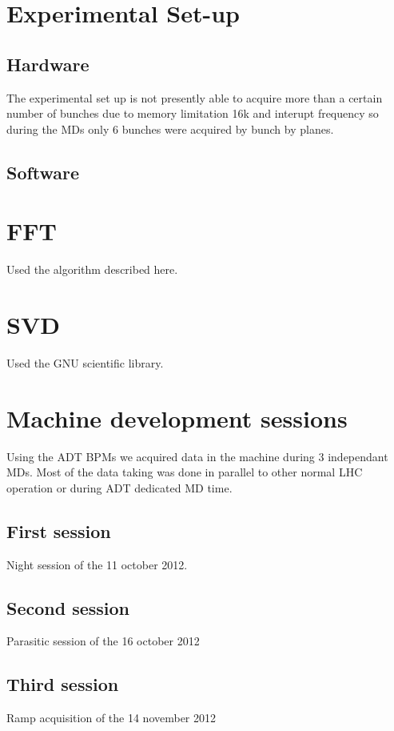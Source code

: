 \section{Experimental Set-up}

   \subsection{Hardware}

	The experimental set up is not presently able to acquire more than a certain number of bunches due to memory limitation 16k and interupt frequency so during the \glspl{MD} only 6 bunches were acquired by bunch by planes.

   \subsection{Software}

\section{FFT}

Used the algorithm described here\cite{Govindaraju07}.

\section{SVD}

Used the GNU scientific library.

\section{Machine development sessions}

Using the \gls{ADT} \glspl{BPM} we acquired data in the machine during 3 independant \glspl{MD}. Most of the data taking was done in parallel to other normal LHC operation or during \gls{ADT} dedicated \gls{MD} time.

   \subsection{First session}
   
   Night session of the 11 october 2012.

   \subsection{Second session}
   
   Parasitic session of the 16 october 2012

   \subsection{Third session}

   Ramp acquisition of the 14 november 2012

